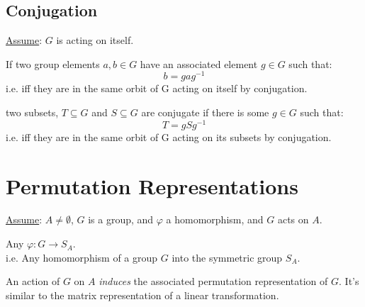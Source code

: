 \subsection{Conjugation}
\underline{Assume}: $G$ is acting on itself.
\begin{defn}
	If two group elements $a, b \in G$ have an associated element $g \in G$ such that:
	\[b = ga{g}^{-1} \]
	i.e. iff they are in the same orbit of G acting on itself by conjugation.
\end{defn}
\begin{defn}
	two subsets, $T \subseteq G$ and $S \subseteq G$ are conjugate if there is some $g \in G$ such that:
	\[ T = gS{g}^{-1} \] 
	i.e. iff they are in the same orbit of G acting on its subsets by conjugation.
\end{defn}

\section{Permutation Representations}
\underline{Assume}: $A \not = \emptyset$, $G$ is a group, and $\varphi$ a homomorphism, and $G$ acts on $A$.
\begin{defn}
	Any $\varphi: G \to {S}_{A}$. \\
	i.e. Any homomorphism of a group $G$ into the symmetric group ${S}_{A}$.
\end{defn}
An action of $G$ on $A$ \textit{induces} the associated permutation representation of $G$. It's similar to the matrix representation of a linear transformation.